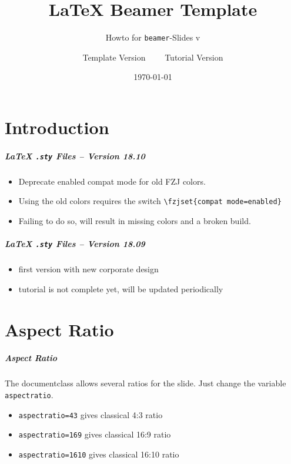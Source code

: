 \documentclass[
t, %
10pt, %
aspectratio=1610, %
ngerman,
english,
]{beamer}
\title{\LaTeX{} Beamer Template}
\subtitle{Howto for {\tt beamer}-Slides v\templateversion}
\author{Template Version \templateversion~~\vrule width0.3pt~~Tutorial Version \tutorialversion}
\institute[My Institute]{My Institute}
\date{\today}
\begin{document}
\maketitle

\maketitle

\part{Introduction}
\makepart

\begin{frame}[label=introduction,fragile]
        \frametitle{{\LaTeX} {\tt .sty} Files -- Version 18.10}
        \begin{itemize}
          \item Deprecate enabled compat mode for old FZJ colors.
          \item Using the old colors requires the switch \verb!\fzjset{compat mode=enabled}!
          \item Failing to do so, will result in missing colors and a broken build.
        \end{itemize}
\end{frame}


\begin{frame}[label=introduction]
        \frametitle{{\LaTeX} {\tt .sty} Files -- Version 18.09}
        \begin{itemize}
          \item first version with new corporate design
          \item tutorial is not complete yet, will be updated periodically
        \end{itemize}
\end{frame}








\part{Aspect Ratio}
\begin{frame}[fragile]
        \frametitle{Aspect Ratio}
        The documentclass allows several ratios for the slide. Just change the variable \verb+aspectratio+.
        \begin{itemize}
          \item \verb+aspectratio=43+ gives classical 4:3 ratio
          \item \verb+aspectratio=169+ gives classical 16:9 ratio
          \item \verb+aspectratio=1610+ gives classical 16:10 ratio
        \end{itemize}
\end{frame}
\end{document}

